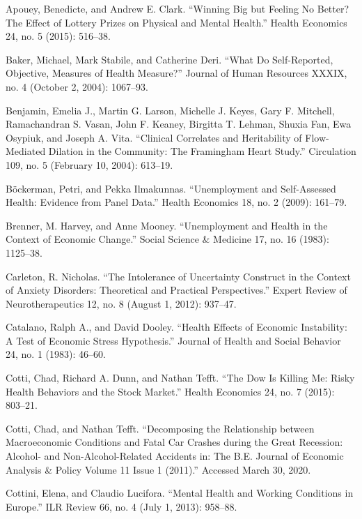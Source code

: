 \documentclass[11pt,a4paper,oldfontcommands]{memoir}
\begin{document}
{\begin{footnotesize}
\begin{thebibliography}{39}

Apouey, Benedicte, and Andrew E. Clark. “Winning Big but Feeling No Better? The Effect of Lottery Prizes on Physical and Mental Health.” Health Economics 24, no. 5 (2015): 516–38.

Baker, Michael, Mark Stabile, and Catherine Deri. “What Do Self-Reported, Objective, Measures of Health Measure?” Journal of Human Resources XXXIX, no. 4 (October 2, 2004): 1067–93.

Benjamin, Emelia J., Martin G. Larson, Michelle J. Keyes, Gary F. Mitchell, Ramachandran S. Vasan, John F. Keaney, Birgitta T. Lehman, Shuxia Fan, Ewa Osypiuk, and Joseph A. Vita. “Clinical Correlates and Heritability of Flow-Mediated Dilation in the Community: The Framingham Heart Study.” Circulation 109, no. 5 (February 10, 2004): 613–19.

Böckerman, Petri, and Pekka Ilmakunnas. “Unemployment and Self-Assessed Health: Evidence from Panel Data.” Health Economics 18, no. 2 (2009): 161–79. 

\bibitem{}
Brenner, M. Harvey, and Anne Mooney. “Unemployment and Health in the Context of Economic Change.” Social Science & Medicine 17, no. 16 (1983): 1125–38. 

\bibitem{}
Carleton, R. Nicholas. “The Intolerance of Uncertainty Construct in the Context of Anxiety Disorders: Theoretical and Practical Perspectives.” Expert Review of Neurotherapeutics 12, no. 8 (August 1, 2012): 937–47. 

\bibitem{}
Catalano, Ralph A., and David Dooley. “Health Effects of Economic Instability: A Test of Economic Stress Hypothesis.” Journal of Health and Social Behavior 24, no. 1 (1983): 46–60. 

\bibitem{}
Cotti, Chad, Richard A. Dunn, and Nathan Tefft. “The Dow Is Killing Me: Risky Health Behaviors and the Stock Market.” Health Economics 24, no. 7 (2015): 803–21.

\bibitem{}
Cotti, Chad, and Nathan Tefft. “Decomposing the Relationship between Macroeconomic Conditions and Fatal Car Crashes during the Great Recession: Alcohol- and Non-Alcohol-Related Accidents in: The B.E. Journal of Economic Analysis & Policy Volume 11 Issue 1 (2011).” Accessed March 30, 2020. 

\bibitem{}
Cottini, Elena, and Claudio Lucifora. “Mental Health and Working Conditions in Europe.” ILR Review 66, no. 4 (July 1, 2013): 958–88. 


\end{thebibliography}
\end{footnotesize}}
\end{document}

